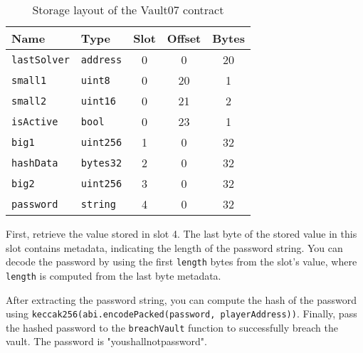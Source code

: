 \documentclass[12pt]{article}
\begin{document}
\begin{table}[h!]
    \centering
    \begin{tabular}{|l|l|c|c|c|}
        \hline
        \textbf{Name}      & \textbf{Type}    & \textbf{Slot} & \textbf{Offset} & \textbf{Bytes} \\ \hline
        \texttt{lastSolver} & \texttt{address} & 0             & 0               & 20             \\ \hline
        \texttt{small1}    & \texttt{uint8}   & 0             & 20              & 1              \\ \hline
        \texttt{small2}    & \texttt{uint16}  & 0             & 21              & 2              \\ \hline
        \texttt{isActive}  & \texttt{bool}    & 0             & 23              & 1              \\ \hline
        \texttt{big1}      & \texttt{uint256} & 1             & 0               & 32             \\ \hline
        \texttt{hashData}  & \texttt{bytes32} & 2             & 0               & 32             \\ \hline
        \texttt{big2}      & \texttt{uint256} & 3             & 0               & 32             \\ \hline
        \texttt{password}  & \texttt{string}  & 4             & 0               & 32             \\ \hline
    \end{tabular}
    \caption{Storage layout of the Vault07 contract}
    \label{tab:vault07_storage}
\end{table}


First, retrieve the value stored in slot 4. The last byte of the stored value in this slot contains metadata, indicating the length of the password string. You can decode the password by using the first \texttt{length} bytes from the slot's value, where \texttt{length} is computed from the last byte metadata.

After extracting the password string, you can compute the hash of the password using \texttt{keccak256(abi.encodePacked(password, playerAddress))}. Finally, pass the hashed password to the \texttt{breachVault} function to successfully breach the vault. The password is "youshallnotpassword".
\end{document}
